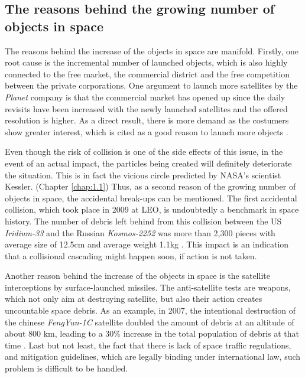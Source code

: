 \bigskip
\subsection{The reasons behind the growing number of objects in space}
\bigskip
The reasons behind the increase of the objects in space are manifold. Firstly, one root cause is the incremental number of launched objects, which is also highly connected to the free market, the commercial district and the free competition between the private corporations. %
One argument to launch more satellites by the \textit{Planet} company is that the commercial market has opened up since the daily revisits have been increased with the newly launched satellites and the offered resolution is higher. As a direct result, there is more demand as the costumers show greater interest, which is cited as a good reason to launch more objects \cite{CNBC}.

Even though the risk of collision is one of the side effects of this issue, in the event of an actual impact, the particles being created will definitely deteriorate the situation. This is in fact the vicious circle predicted by NASA's scientist Kessler. (Chapter \ref{chap:1.1}) Thus, as a second reason of the growing number of objects in space, the accidental break-ups can be mentioned. The first accidental collision, which took place in 2009 at LEO, is undoubtedly a benchmark in space history. The number of debris left behind from this collision between the US \textit{Iridium-33} and the Russian \textit{Kosmos-2252} was more than 2,300 pieces with average size of 12.5cm and average weight 1.1kg \cite{Kelso 2009}. This impact is an indication that a collisional cascading might happen soon, if action is not taken.

Another reason behind the increase of the objects in space is the satellite interceptions by surface-launched missiles. The anti-satellite tests are weapons, which not only aim at destroying satellite, but also their action creates uncountable space debris. As an example, in 2007, the intentional destruction of the chinese \textit{FengYun-1C} satellite doubled the amount of debris at an altitude of about 800 km, leading to a 30\% increase in the total population of debris at that time \cite{Anti-satellite}. Last but not least, the fact that there is lack of space traffic regulations, and mitigation guidelines, which are legally binding under international law, such problem is difficult to be handled.

